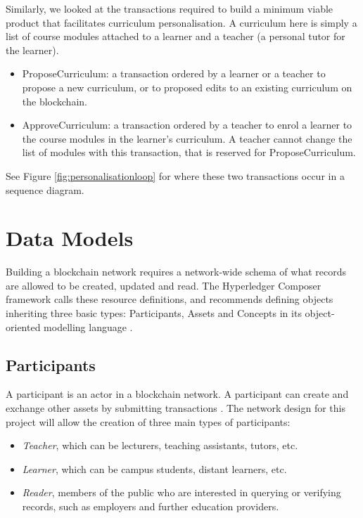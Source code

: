 Similarly, we looked at the transactions required to build a minimum viable product
that facilitates curriculum personalisation. A curriculum here is simply a list of course
modules attached to a learner and a teacher (a personal tutor for the learner).

\begin{itemize}
	\setlength\itemsep{0em}
	\item ProposeCurriculum: a transaction ordered by a learner or a teacher to propose
	      a new curriculum, or to proposed edits to an existing curriculum on the blockchain.
	\item ApproveCurriculum: a transaction ordered by a teacher to enrol a learner to
		  the course modules in the learner's curriculum. 
		  A teacher cannot change the list of modules with this transaction, that is reserved for ProposeCurriculum.
\end{itemize}

See Figure \ref{fig:personalisationloop} for where these two transactions occur in a sequence diagram.

\section{Data Models}

Building a blockchain network requires a network-wide schema of what records are allowed to be created, updated and read.
The Hyperledger Composer framework calls these resource definitions, and recommends defining objects
inheriting three basic types: Participants, Assets and Concepts in its object-oriented modelling language
\citep{official2018composer}.

\subsection{Participants}

A participant is an actor in a blockchain network. A participant can create and exchange other assets
by submitting transactions \citep{official2018composer}.
The network design for this project will allow the creation of three main types of participants:
\begin{itemize}
	\setlength\itemsep{0em}
	\item \textit{Teacher}, which can be lecturers, teaching assistants, tutors, etc.
	\item \textit{Learner}, which can be campus students, distant learners, etc.
	\item \textit{Reader}, members of the public who are interested in querying or verifying records,
	      such as employers and further education providers.
\end{itemize}

